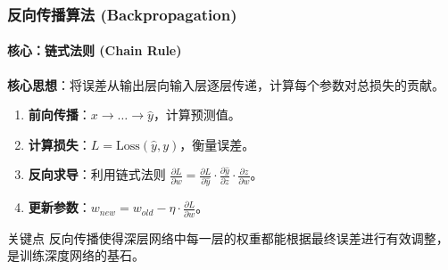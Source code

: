 \documentclass[12pt, t, aspectratio=169]{beamer}
\begin{document}
\begin{frame}
    \frametitle{反向传播算法 (Backpropagation)}
    \framesubtitle{核心：链式法则 (Chain Rule)}
    
    \textbf{核心思想}：将误差从输出层向输入层逐层传递，计算每个参数对总损失的贡献。
    
    \begin{enumerate}
        \item \textbf{前向传播}：$x \rightarrow \dots \rightarrow \hat{y}$，计算预测值。
        \item \textbf{计算损失}：$L = \text{Loss}(\hat{y}, y)$，衡量误差。
        \item \textbf{反向求导}：利用链式法则 $\frac{\partial L}{\partial w} = \frac{\partial L}{\partial \hat{y}} \cdot \frac{\partial \hat{y}}{\partial z} \cdot \frac{\partial z}{\partial w}$。
        \item \textbf{更新参数}：$w_{new} = w_{old} - \eta \cdot \frac{\partial L}{\partial w}$。
    \end{enumerate}
    
    \begin{alertblock}{关键点}
        反向传播使得深层网络中每一层的权重都能根据最终误差进行有效调整，是训练深度网络的基石。
    \end{alertblock}
\end{frame}
\end{document}
